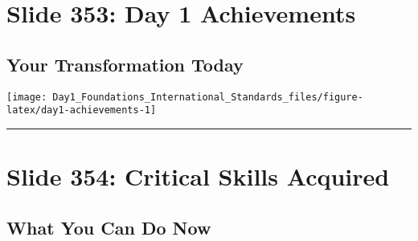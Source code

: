 \documentclass[
]{article}
\begin{document}
\section{Slide 353: Day 1
Achievements}\label{slide-353-day-1-achievements}

\subsection{Your Transformation Today}\label{your-transformation-today}

\texttt{[image: Day1\_Foundations\_International\_Standards\_files/figure-latex/day1-achievements-1]}

\begin{center}\rule{0.5\linewidth}{0.5pt}\end{center}

\section{Slide 354: Critical Skills
Acquired}\label{slide-354-critical-skills-acquired}

\subsection{What You Can Do Now}\label{what-you-can-do-now}
\end{document}
